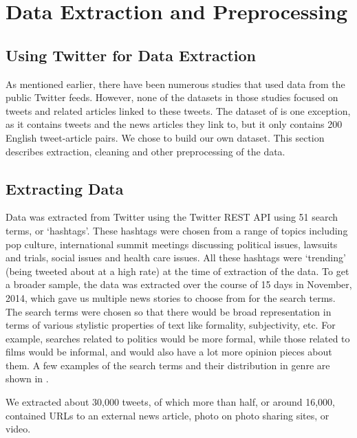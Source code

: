\section{Data Extraction and Preprocessing}

\subsection{Using Twitter for Data Extraction}

As mentioned earlier, there have been numerous studies that used data from the public Twitter feeds. However, none of the datasets in those studies focused on tweets and related articles linked to these tweets. The dataset of  is one exception, as it contains tweets and the news articles they link to, but it only contains 200 English tweet-article pairs. We chose to build our own dataset. This section describes extraction, cleaning and other preprocessing of the data. 

\subsection{Extracting Data}

Data was extracted from Twitter using the Twitter REST API using 51 search terms, or ‘hashtags’. These hashtags were chosen from a range of topics including pop culture,  international summit meetings discussing political issues, lawsuits and trials, social issues and health care issues. All these hashtags were ‘trending’ (being tweeted about at a high rate) at the time of extraction of the data. To get a broader sample, the data was extracted over the course of 15 days in November, 2014, which gave us multiple news stories to choose from for the search terms. The search terms were chosen so that there would be broad representation in terms of various stylistic properties of text like formality, subjectivity, etc. For example, searches related to politics would be more formal, while those related to films would be informal, and would also have a lot more opinion pieces about them. A few examples of the search terms and their distribution in genre are shown in .

We extracted about 30,000 tweets, of which more than half, or around 16,000, contained URLs to an external news article, photo on photo sharing sites, or video. %

